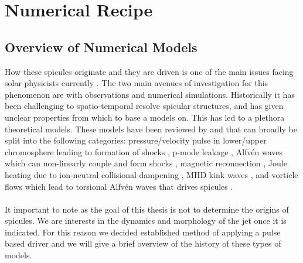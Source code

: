 \documentclass[12pt]{ociamthesis}
\newcommand{\Alfven}{Alfv\'{e}n }
\newcommand{\np}{\\ \\}
\begin{document}
\baselineskip=18pt


\chapter{Numerical Recipe}
\label{chap:Numerical_Recipe}
\section{Overview of Numerical Models}
\label{sec:models}
How these spicules originate and they are driven is one of the main issues facing solar physicists currently \citep{Tsiropoula2012,kuzma2017ApJ84978K,Martinez-Sykora2017}. The two main avenues of investigation for this phenomenon are with observations and numerical simulations. Historically it has been challenging to spatio-temporal resolve spicular structures, and has given unclear properties from which to base a models on. This has led to a plethora theoretical models. These models have been reviewed by \cite{Sterling_2000SoPh} and \cite{Aschwanden2019ASSL} that can broadly be split into the following categories: pressure/velocity pulse in lower/upper chromosphere leading to formation of shocks \citep{Shibata1982,Suematsu1982SoPh7599S,Hollweg1982ApJ257345H,Sterling1990ApJ349647S,Heggland2007ApJ6661277H,kuzma2017ApJ84978K}, p-mode leakage \citep{Pontieu2004Natur},  \Alfven waves which can non-linearly couple and form shocks \citep{Hollweg1982SoPh7535H,Hollweg1992ApJ389731H, Kudoh1999ApJ514493K, Matsumoto2010ApJ7101857M}, magnetic reconnection \citep{Yokoyama1995Natur37542Y,Yokoyama1996PASJ48353Y, Archontis2005ApJ6351299A, Pontieu2007PASJ,Isobe2008ApJ679L57I,Nishizuka2008ApJ683L83N,Sterling2010ApJ,Gonz2017ApJ,Gonz2018arXiv180704224G,Gonz2018ApJ856176G}, Joule heating due to ion-neutral collisional dampening \citep{Haerendel1992Natur360241H,James2003AA}, MHD kink waves \citep{Kukhianidze2006A&A}, and vorticle flows which lead to torsional \Alfven waves that drives spicules \citep{Iijima2017ApJ,Samanta2019Sci}. \np
%
It important to note as the goal of this thesis is not to determine the origins of spicules. We are interests in the dynamics and morphology of the jet once it is indicated. For this reason we decided established method of applying a pulse based driver and we will give a brief overview of the history of these types of models.   
\end{document}
